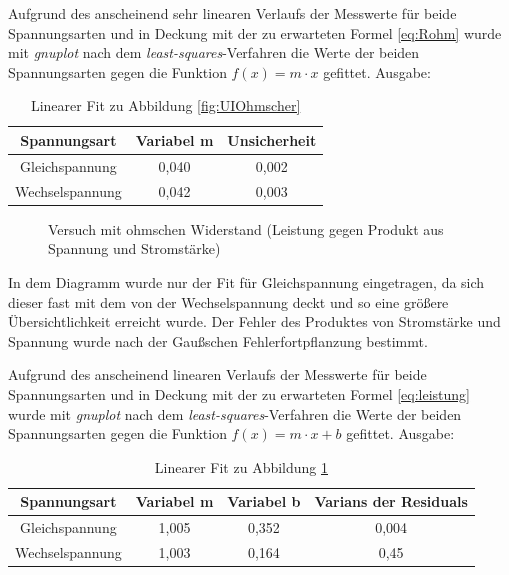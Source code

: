 Aufgrund des anscheinend sehr linearen Verlaufs der Messwerte für beide Spannungsarten und in Deckung mit der zu erwarteten Formel \eqref{eq:Rohm} wurde mit \emph{gnuplot} nach dem \emph{least-squares}-Verfahren die Werte der beiden Spannungsarten gegen die Funktion $f(x)=m\cdot x$ gefittet. Ausgabe:
\begin{table}[H]
  \centering
  \begin{tabular}{c | c | c }
    Spannungsart & Variabel m  & Unsicherheit\\ \hline
    Gleichspannung & 0{,}040 & 0{,}002\\
    Wechselspannung & 0{,}042 & 0{,}003
  \end{tabular}
  \caption{Linearer Fit zu Abbildung \ref{fig:UIOhmscher}}
  \label{tab:fitUIOhmscher}
\end{table}
\begin{figure}[H]
  \centering
  \caption{Versuch mit ohmschen Widerstand (Leistung gegen Produkt aus Spannung und Stromstärke)}
  \label{fig:PUIOhmscher}
\end{figure}
In dem Diagramm wurde nur der Fit für Gleichspannung eingetragen, da sich dieser fast mit dem von der Wechselspannung deckt und so eine größere Übersichtlichkeit erreicht wurde. Der Fehler des Produktes von Stromstärke und Spannung wurde nach der Gaußschen Fehlerfortpflanzung bestimmt.

Aufgrund des anscheinend linearen Verlaufs der Messwerte für beide Spannungsarten und in Deckung mit der zu erwarteten Formel \ref{eq:leistung} wurde mit \emph{gnuplot} nach dem \emph{least-squares}-Verfahren die Werte der beiden Spannungsarten gegen die Funktion $f(x)=m\cdot x+b$ gefittet. Ausgabe:
\begin{table}[H]
  \centering
  \begin{tabular}{c | c | c | c}
    Spannungsart & Variabel m & Variabel b & Varians der Residuals\\ \hline
    Gleichspannung & 1,005 & 0,352 & 0,004\\
    Wechselspannung & 1,003 & 0,164 & 0,45
  \end{tabular}
  \caption{Linearer Fit zu Abbildung \ref{fig:PUIOhmscher}}
  \label{tab:fitPUIOhmscher}
\end{table}
